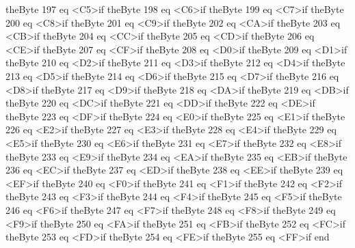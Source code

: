 {theByte 197 eq {<C5>}if
theByte 198 eq {<C6>}if
theByte 199 eq {<C7>}if
theByte 200 eq {<C8>}if
theByte 201 eq {<C9>}if
theByte 202 eq {<CA>}if
theByte 203 eq {<CB>}if
theByte 204 eq {<CC>}if
theByte 205 eq {<CD>}if
theByte 206 eq {<CE>}if
theByte 207 eq {<CF>}if
theByte 208 eq {<D0>}if
theByte 209 eq {<D1>}if
theByte 210 eq {<D2>}if
theByte 211 eq {<D3>}if
theByte 212 eq {<D4>}if
theByte 213 eq {<D5>}if
theByte 214 eq {<D6>}if
theByte 215 eq {<D7>}if
theByte 216 eq {<D8>}if
theByte 217 eq {<D9>}if
theByte 218 eq {<DA>}if
theByte 219 eq {<DB>}if
theByte 220 eq {<DC>}if
theByte 221 eq {<DD>}if
theByte 222 eq {<DE>}if
theByte 223 eq {<DF>}if
theByte 224 eq {<E0>}if
theByte 225 eq {<E1>}if
theByte 226 eq {<E2>}if
theByte 227 eq {<E3>}if
theByte 228 eq {<E4>}if
theByte 229 eq {<E5>}if
theByte 230 eq {<E6>}if
theByte 231 eq {<E7>}if
theByte 232 eq {<E8>}if
theByte 233 eq {<E9>}if
theByte 234 eq {<EA>}if
theByte 235 eq {<EB>}if
theByte 236 eq {<EC>}if
theByte 237 eq {<ED>}if
theByte 238 eq {<EE>}if
theByte 239 eq {<EF>}if
theByte 240 eq {<F0>}if
theByte 241 eq {<F1>}if
theByte 242 eq {<F2>}if
theByte 243 eq {<F3>}if
theByte 244 eq {<F4>}if
theByte 245 eq {<F5>}if
theByte 246 eq {<F6>}if
theByte 247 eq {<F7>}if
theByte 248 eq {<F8>}if
theByte 249 eq {<F9>}if
theByte 250 eq {<FA>}if
theByte 251 eq {<FB>}if
theByte 252 eq {<FC>}if
theByte 253 eq {<FD>}if
theByte 254 eq {<FE>}if
theByte 255 eq {<FF>}if
end\space
}

\newcommand{\fcColorToColorStringCode}{
5 dict begin
/theColor exch def
/theColor [theColor {cvi} forall] def
theColor 0 get
theColor 0 get 255 gt {pop 255}if
theColor 0 get 0 lt {pop 0}if
\fcByteToHexStringCode %
theColor 1 get
theColor 1 get 255 gt {pop 255}if
theColor 1 get 0 lt {pop 0}if
\fcByteToHexStringCode %
theColor 2 get
theColor 2 get 255 gt {pop 255}if
theColor 2 get 0 lt {pop 0} if
\fcByteToHexStringCode %
3 \fcConcatenateMultiple
end
}

\newcommand{\fcColorFromColorBaseAndPoint}{
5 dict begin
\fcScreen\space pop \fcVectorNormalize \fcVectorScalarVector
/theScalarProd exch def
/currentColor exch def
/theColorDifference
/getZmax where {pop
getZmax getZmin sub dup 0 eq {(Zmax equal Zmin, something is wrong!) == pop 1}if
theScalarProd getZmin sub exch div 0.5 sub \fcLightDifference\space mul
}{0}ifelse
def
currentColor [theColorDifference theColorDifference theColorDifference] \fcVectorMinusVector
end\space
}

\newcommand{\fcShFillPlaneFromLightSourceGetColorFromXYCode}{
\fcGetPointOnPlaneThatProjectsToXYCode\space
currentColor exch
\fcColorFromColorBaseAndPoint \space 255 \fcVectorTimesScalar
\fcColorToColorStringCode\space
}


